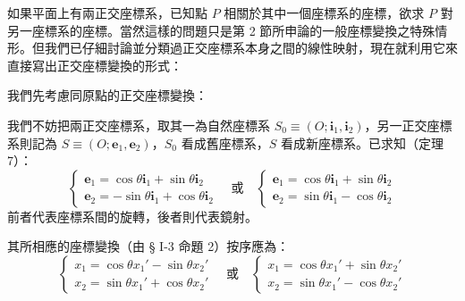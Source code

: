 如果平面上有兩正交座標系，已知點 $P$ 相關於其中一個座標系的座標，欲求 $P$ 對另一座標系的座標。當然這樣的問題只是第 2 節所申論的一般座標變換之特殊情形。但我們已仔細討論並分類過正交座標系本身之間的線性映射，現在就利用它來直接寫出正交座標變換的形式：

我們先考慮同原點的正交座標變換：

我們不妨把兩正交座標系，取其一為自然座標系 $S_0 \equiv (O; \mathbf{i}_1, \mathbf{i}_2)$，另一正交座標系則記為 $S \equiv (O; \mathbf{e}_1, \mathbf{e}_2)$，$S_0$ 看成舊座標系，$S$ 看成新座標系。已求知（定理 7）：
\begin{equation}
\begin{cases}
\mathbf{e}_1 = \cos\theta\mathbf{i}_1 + \sin\theta\mathbf{i}_2 \\
\mathbf{e}_2 = -\sin\theta\mathbf{i}_1 + \cos\theta\mathbf{i}_2
\end{cases} \quad \text{或} \quad
\begin{cases}
\mathbf{e}_1 = \cos\theta\mathbf{i}_1 + \sin\theta\mathbf{i}_2 \\
\mathbf{e}_2 = \sin\theta\mathbf{i}_1 - \cos\theta\mathbf{i}_2
\end{cases} \label{eq:b4-1-5-1}
\end{equation}
前者代表座標系間的旋轉，後者則代表鏡射。

其所相應的座標變換（由 § I-3 命題 2）按序應為：
\begin{equation}
\begin{cases}
x_1 = \cos\theta x_1' - \sin\theta x_2' \\
x_2 = \sin\theta x_1' + \cos\theta x_2'
\end{cases} \quad \text{或} \quad
\begin{cases}
x_1 = \cos\theta x_1' + \sin\theta x_2' \\
x_2 = \sin\theta x_1' - \cos\theta x_2'
\end{cases} \label{eq:b4-1-5-2}
\end{equation}

